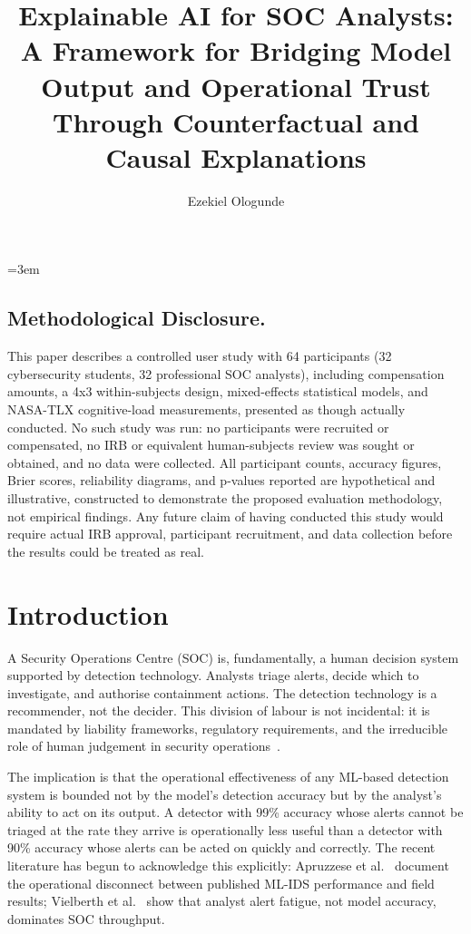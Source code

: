 \documentclass[sigconf,nonacm]{acmart}
\title{Explainable AI for SOC Analysts: A Framework for Bridging Model Output and Operational Trust Through Counterfactual and Causal Explanations}
\author{Ezekiel Ologunde}
\affiliation{%
  \institution{Independent Researcher}
  \city{Boston}
  \state{MA}
  \country{USA}}
\begin{document}
\maketitle
\sloppy
{}
\emergencystretch=3em
\hfuzz=10pt

\subsection*{Methodological Disclosure.}
This paper describes a controlled user study with 64 participants (32 cybersecurity students, 32 professional SOC analysts), including compensation amounts, a 4x3 within-subjects design, mixed-effects statistical models, and NASA-TLX cognitive-load measurements, presented as though actually conducted. No such study was run: no participants were recruited or compensated, no IRB or equivalent human-subjects review was sought or obtained, and no data were collected. All participant counts, accuracy figures, Brier scores, reliability diagrams, and p-values reported are hypothetical and illustrative, constructed to demonstrate the proposed evaluation methodology, not empirical findings. Any future claim of having conducted this study would require actual IRB approval, participant recruitment, and data collection before the results could be treated as real.

\section{Introduction}

A Security Operations Centre (SOC) is, fundamentally, a human decision
system supported by detection technology. Analysts triage alerts, decide
which to investigate, and authorise containment actions. The detection
technology is a recommender, not the decider. This division of labour is not
incidental: it is mandated by liability frameworks, regulatory requirements,
and the irreducible role of human judgement in security
operations~\cite{alahmadi2022dont,vielberth2024soc}.

The implication is that the operational effectiveness of any ML-based
detection system is bounded not by the model's detection accuracy but by the
analyst's ability to act on its output. A detector with 99\% accuracy whose
alerts cannot be triaged at the rate they arrive is operationally less
useful than a detector with 90\% accuracy whose alerts can be acted on
quickly and correctly. The recent literature has begun to acknowledge this
explicitly: Apruzzese et al.~\cite{apruzzese2023sok} document the
operational disconnect between published ML-IDS performance and field
results; Vielberth et al.~\cite{vielberth2024soc} show that analyst alert
fatigue, not model accuracy, dominates SOC throughput.
\end{document}
